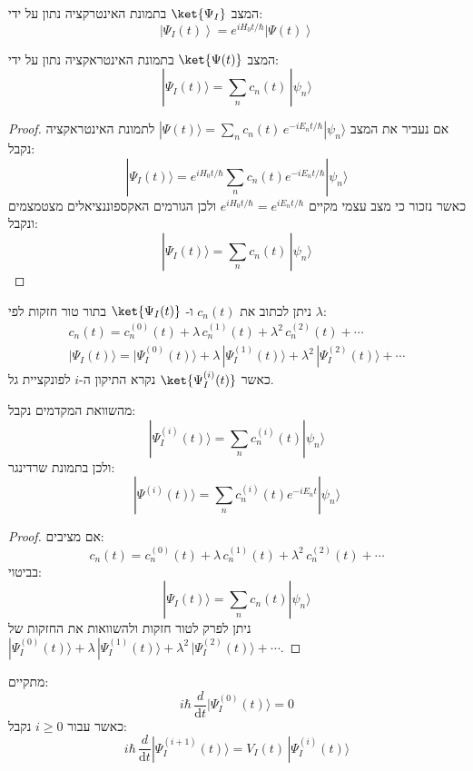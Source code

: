 \documentclass{tstextbook}
\begin{document}
\begin{reminder}
המצב \(\ket{\Psi_{I}}\) בתמונת האינטרקציה נתון על ידי:
$$\left|\Psi_{I}(t)\right\rangle=e^{i H_{0}t/\hbar}\left|\Psi(t)\right\rangle$$

\end{reminder}
\begin{corollary}
המצב \(\ket{\Psi(t)}\) בתמונת האינטראקציה נתון על ידי:
$$|\Psi_{I}(t)\rangle=\sum_{n}c_{n}(t)\,|\psi_{n}\rangle$$

\end{corollary}
\begin{proof}
אם נעביר את המצב \(|\Psi(t)\rangle=\sum_{n}c_{n}(t)\,e^{-i E_{n}t/\hbar}|\psi_{n}\rangle\) לתמונת האינטראקציה נקבל:
$$|\Psi_{I}(t)\rangle=e^{i H_{0}t/\hbar}\sum_{n}c_{n}(t)e^{-i E_{n}t/\hbar}|\psi_{n}\rangle$$
כאשר נזכור כי מצב עצמי מקיים \(e^{iH_{0} t/\hbar}=e^{ iE_{n}t/\hbar }\) ולכן הגורמים האקספוננציאלים מצטמצמים ונקבל:
$$|\Psi_{I}(t)\rangle=\sum_{n}c_{n}(t)\,|\psi_{n}\rangle$$

\end{proof}
\begin{symbolize}
ניתן לכתוב את \(c_{n}(t)\) ו- \(\ket{\Psi_{I}(t)}\) בתור טור חזקות לפי \(\lambda\):
$$\begin{gather}c_{n}(t)=c_{n}^{(0)}(t)+\lambda\,c_{n}^{(1)}(t)+\lambda^{2}\,c_{n}^{(2)}(t)+\cdots\\|\Psi_{I}(t)\rangle=|\Psi_{I}^{(0)}(t)\rangle+\lambda\,|\Psi_{I}^{(1)}(t)\rangle+\lambda^{2}\,|\Psi_{I}^{(2)}(t)\rangle+\cdots  \end{gather}
$$
כאשר \(\ket{\Psi^{(i)}_{I}(t)}\) נקרא התיקון ה-\(i\) לפונקציית גל.

\end{symbolize}
\begin{corollary}
מהשוואת המקדמים נקבל:
$$|\Psi_{I}^{(i)}(t)\rangle=\sum_{n}c_{n}^{(i)}(t)|\psi_{n}\rangle$$
ולכן בתמונת שרדינגר:
$$|\Psi^{(i)}(t)\rangle=\sum_{n}c_{n}^{(i)}(t)e^{-i E_{n}t}|\psi_{n}\rangle$$

\end{corollary}
\begin{proof}
אם מציבים:
$$c_{n}(t)=c_{n}^{(0)}(t)+\lambda\,c_{n}^{(1)}(t)+\lambda^{2}\,c_{n}^{(2)}(t)+\cdots$$
בביטוי:
$$|\Psi_{I}(t)\rangle=\sum_{n}c_{n}(t)|\psi_{n}\rangle$$
ניתן לפרק לטור חזקות ולהשוואות את החזקות של \(|\Psi_{I}^{(0)}(t)\rangle+\lambda\,|\Psi_{I}^{(1)}(t)\rangle+\lambda^{2}\,|\Psi_{I}^{(2)}(t)\rangle+\cdots\).

\end{proof}
\begin{proposition}
מתקיים:
$$i\hbar\,\frac{d}{\mathrm{d} t}|\Psi_{I}^{(0)}(t)\rangle=0$$
כאשר עבור \(i\geq 0\) נקבל:
$$i\hbar\,\frac{d}{\mathrm{d} t}|\Psi_{I}^{(i+1)}(t)\rangle=V_{I}(t)\,|\Psi_{I}^{(i)}(t)\rangle$$

\end{proposition}
\end{document}
